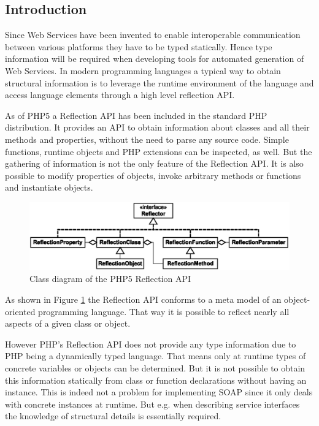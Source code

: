 \documentclass[10pt,final,a4paper,oneside]{article}
\begin{document}
\subsection{Introduction}
Since Web Services have been invented
to enable interoperable communication between
various platforms they have to be typed statically.
Hence type information will be required when
developing tools for automated generation of Web Services.
In modern programming languages
a typical way to obtain structural information
is to leverage the runtime environment of the language
and access language elements through a high level reflection API.

As of PHP5 a Reflection API has been included
in the standard PHP distribution.
It provides an API to obtain information about classes
and all their methods and properties,
without the need to parse any source code.
Simple functions, runtime objects and PHP extensions
can be inspected, as well.
But the gathering of information is not the
only feature of the Reflection API.
It is also possible to modify properties of objects,
invoke arbitrary methods or functions and
instantiate objects.

\begin{figure}[htbp]
	\centering
		\includegraphics[width=1.00\textwidth]{figures/php5-reflection-api.eps}
	\caption{Class diagram of the  PHP5 Reflection API}
	\label{fig:php5-reflection-api}
\end{figure}

As shown in Figure \ref{fig:php5-reflection-api}
the Reflection API conforms to a meta model
of an object-oriented programming language.
That way it is possible to reflect
nearly all aspects of a given class or object.

However PHP's Reflection API does not provide any type information
due to PHP being a dynamically typed language.
That means only at runtime types of concrete variables or objects
can be determined.
But it is not possible to obtain this information statically from
class or function declarations without having an instance.
This is indeed not a problem for implementing SOAP
since it only deals with concrete instances at runtime.
But e.g. when describing service interfaces
the knowledge of structural details is essentially required.
\end{document}
